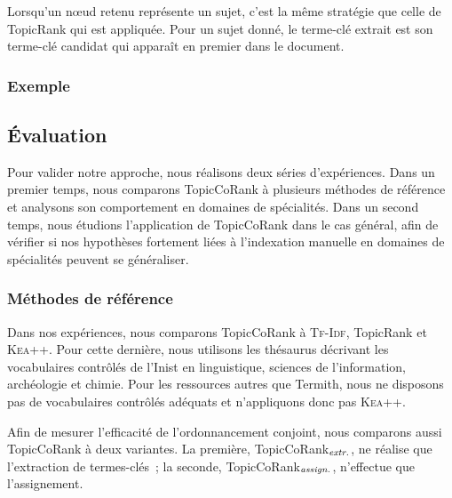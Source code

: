         Lorsqu'un n\oe{}ud retenu représente un sujet, c'est la même stratégie
        que celle de TopicRank qui est appliquée. Pour un sujet donné, le
        terme-clé extrait est son terme-clé candidat qui apparaît en premier
        dans le document.

      \subsubsection{Exemple}
      \label{subsubsec:main-domain_specific_keyphrase_annotation-supervised_automatic_keyphrase_extraction-topiccorank-exemple}
        \TODO{\dots}

    \subsection{Évaluation}
    \label{subsec:main-domain_specific_keyphrase_annotation-supervised_automatic_keyphrase_annotation-evaluation}
      Pour valider notre approche, nous réalisons deux séries d'expériences.
      Dans un premier temps, nous comparons TopicCoRank à plusieurs méthodes de
      référence et analysons son comportement en domaines de spécialités. Dans
      un second temps, nous étudions l'application de TopicCoRank dans le cas
      général, afin de vérifier si nos hypothèses fortement liées à l'indexation
      manuelle en domaines de spécialités peuvent se généraliser.

      \subsubsection{Méthodes de référence}
      \label{subsubsec:main-domain_specific_keyphrase_annotation-supervised_automatic_keyphrase_annotation-evaluation-baselines}
        Dans nos expériences, nous comparons TopicCoRank à \textsc{Tf-Idf},
        TopicRank et \textsc{Kea++}. Pour cette dernière, nous utilisons les
        thésaurus décrivant les vocabulaires contrôlés de l'Inist en
        linguistique, sciences de l'information, archéologie et chimie. Pour les
        ressources autres que Termith, nous ne disposons pas de vocabulaires
        contrôlés adéquats et n'appliquons donc pas \textsc{Kea++}.

        Afin de mesurer l'efficacité de l'ordonnancement conjoint, nous
        comparons aussi TopicCoRank à deux variantes. La première,
        TopicCoRank$_\textnormal{\textit{extr.}}$, ne réalise que l'extraction
        de termes-clés~; la seconde,
        TopicCoRank$_\textnormal{\textit{assign.}}$, n'effectue que
        l'assignement.


